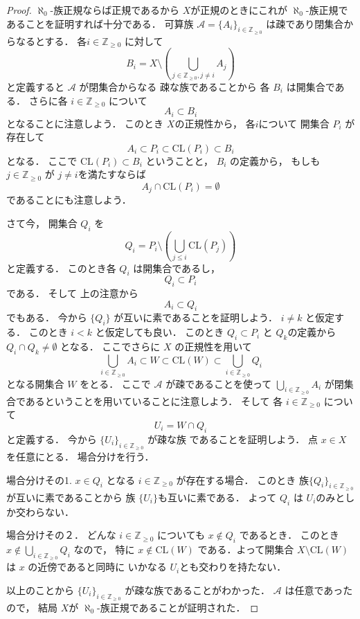 \documentclass[leqno, a4paper, 12pt]{jsarticle}
\newcommand{\zz}{\mathbb{Z}}
\newcommand{\cl}{\mathrm{CL}}
\begin{document}
\begin{proof}
$\aleph_{0}$-族正規ならば正規であるから
$X$が正規のときにこれが
$\aleph_{0}$-族正規であることを証明すれば十分である．
可算族
$\mathcal{A}=\{A_{i}\}_{i\in\zz_{\ge 0}}$
は疎であり閉集合からなるとする．
各$i\in \zz_{\ge 0}$
に対して
\[
B_{i}=X\setminus \left(\bigcup_{j\in \zz_{\ge 0}, j\neq i}A_{j}\right)
\]
と定義すると
$\mathcal{A}$
が閉集合からなる
疎な族であることから
各
$B_{i}$
は開集合である．
さらに各
$i\in \zz_{\ge 0}$
について
\[
A_{i}\subset B_{i}
\]
となることに注意しよう．
このとき
$X$の正規性から，
各$i$について
開集合
$P_{i}$
が存在して
\[
A_{i}\subset P_{i}\subset \cl(P_{i})\subset B_{i}
\]
となる．
ここで
$\cl(P_{i})\subset B_{i}$
ということと，
$B_{i}$
の定義から，
もしも
$j\in\zz_{\ge 0}$
が
$j\neq i$を満たすならば
\[
A_{j}\cap \cl(P_{i})=\emptyset
\]
であることにも注意しよう．


さて今，
開集合
$Q_{i}$
を
\[
Q_{i}=P_{i}\setminus \left(\bigcup_{j\le i}\cl(P_{j})\right)
\]
と定義する．
このとき各
$Q_{i}$
は開集合であるし，
\[
Q_{i}\subset P_{i}
\]
である．
そして
上の注意から
\[
A_{i}\subset  Q_{i}
\]
でもある．
今から
$\{Q_{i}\}$
が互いに素であることを証明しよう．
$i\neq k$
と仮定する．
このとき
$i<k$
と仮定しても良い．
このとき
$Q_{i}\subset P_{i}$
と
$Q_{k}$の定義から
$Q_{i}\cap Q_{k}\neq \emptyset$
となる．
ここでさらに
$X$
の正規性を用いて
\[
\bigcup_{i\in \zz_{\ge 0}}A_{i}\subset W
\subset \cl(W)
\subset \bigcup_{i\in \zz_{\ge 0}}Q_{i}
\]
となる開集合
$W$
をとる．
ここで
$\mathcal{A}$
が疎であることを使って
$\bigcup_{i\in \zz_{\ge 0}}A_{i}$
が閉集合であるということを用いていることに注意しよう．
そして
各
$i\in \zz_{\ge 0}$
について
\[
U_{i}=W\cap Q_{i}
\]
と定義する．
今から
$\{U_{i}\}_{i\in \zz_{\ge 0}}$
が疎な族
であることを証明しよう．
点
$x\in X$
を任意にとる．
場合分けを行う．




場合分けその1. 
$x\in Q_{i}$
となる
$i\in \zz_{\ge 0}$
が存在する場合．
このとき
族$\{Q_{i}\}_{i\in \zz_{\ge 0}}$
が互いに素であることから
族
$\{U_{i}\}$も互いに素である．
よって
$Q_{i}$
は
$U_{i}$のみとしか交わらない．



場合分けその２．
どんな
$i\in \zz_{\ge 0}$
についても
$x\not\in Q_{i}$
であるとき．
このとき
$x\not \in \bigcup_{i\in \zz_{\ge 0}} Q_{i}$
なので，
特に
$x\not\in \cl(W)$
である．よって開集合
$X\setminus \cl(W)$
は
$x$
の近傍であると同時に
いかなる
$U_{i}$とも交わりを持たない．



以上のことから
$\{U_{i}\}_{i\in \zz_{\ge 0}}$
が疎な族であることがわかった．
$\mathcal{A}$
は任意であったので，
結局
$X$が
$\aleph_{0}$-族正規であることが証明された．
\end{proof}
\end{document}
